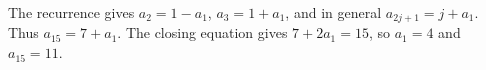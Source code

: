 The recurrence gives $ a_2=1-a_1 $, $ a_3=1+a_1 $, and in general $ a_{2j+1}=j+a_1 $. Thus $ a_{15}=7+a_1 $. The closing equation gives $ 7+2a_1=15 $, so $ a_1=4 $ and $\boxed{a_{15}=11}$.
